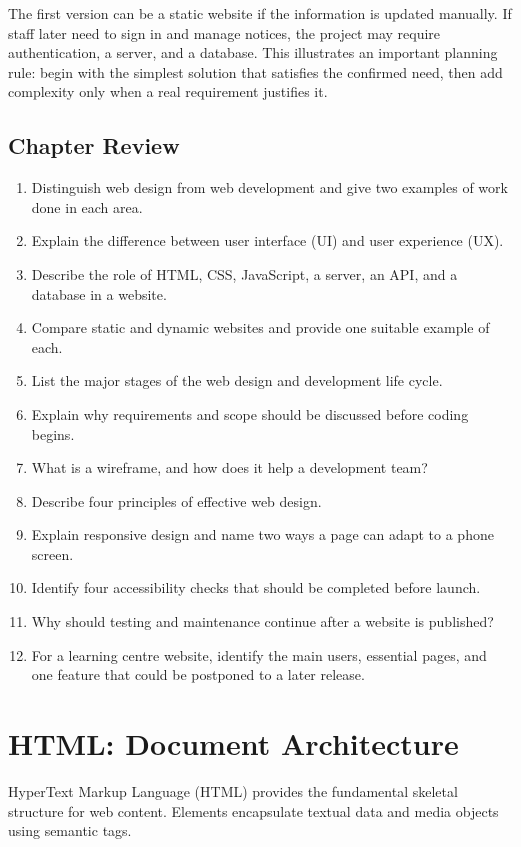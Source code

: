 \documentclass[11pt,openany,oneside]{book}
\begin{document}
The first version can be a static website if the information is updated manually. If staff later need to sign in and manage notices, the project may require authentication, a server, and a database. This illustrates an important planning rule: begin with the simplest solution that satisfies the confirmed need, then add complexity only when a real requirement justifies it.

\section{Chapter Review}
\begin{enumerate}
\item Distinguish web design from web development and give two examples of work done in each area.
\item Explain the difference between user interface (UI) and user experience (UX).
\item Describe the role of HTML, CSS, JavaScript, a server, an API, and a database in a website.
\item Compare static and dynamic websites and provide one suitable example of each.
\item List the major stages of the web design and development life cycle.
\item Explain why requirements and scope should be discussed before coding begins.
\item What is a wireframe, and how does it help a development team?
\item Describe four principles of effective web design.
\item Explain responsive design and name two ways a page can adapt to a phone screen.
\item Identify four accessibility checks that should be completed before launch.
\item Why should testing and maintenance continue after a website is published?
\item For a learning centre website, identify the main users, essential pages, and one feature that could be postponed to a later release.
\end{enumerate}

\chapter{HTML: Document Architecture}
HyperText Markup Language (HTML) provides the fundamental skeletal structure for web content. Elements encapsulate textual data and media objects using semantic tags.
\end{document}
